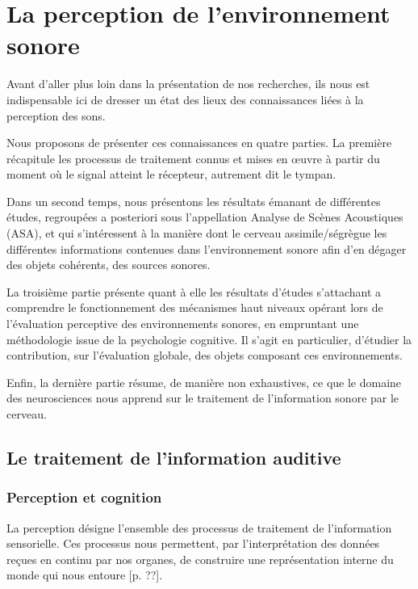 \chapter{La perception de l'environnement sonore}\label{ch:psycho_ea}

Avant d'aller plus loin dans la présentation de nos recherches, ils nous est indispensable ici de dresser  un état des lieux des connaissances liées à la perception des sons.

Nous proposons de présenter ces connaissances en quatre parties. La première récapitule les processus de traitement connus et mises en œuvre à partir du moment où le signal atteint le récepteur, autrement dit le tympan. 

Dans un second temps, nous présentons les résultats émanant de différentes études, regroupées a posteriori sous l'appellation Analyse de Scènes Acoustiques (ASA), et qui s'intéressent à la manière dont le cerveau assimile/ségrègue  les différentes informations contenues dans l'environnement sonore afin d'en dégager des objets cohérents, \ie des sources sonores. 

La troisième partie présente quant à elle les résultats d'études s'attachant a comprendre le fonctionnement  des mécanismes haut niveaux opérant lors de l'évaluation perceptive des environnements sonores, en empruntant une méthodologie issue de la psychologie cognitive. Il s'agit en particulier, d'étudier la contribution, sur l'évaluation globale, des objets composant ces environnements.

Enfin, la dernière partie résume, de manière non exhaustives, ce que le domaine des neurosciences nous apprend sur le traitement de l'information sonore par le cerveau. 

\section{Le traitement de l'information auditive}

\subsection{Perception et cognition}

La perception désigne l'ensemble des processus de traitement de l'information sensorielle. Ces processus nous permettent, par l'interprétation des données reçues en continu par nos organes, de construire une représentation interne du monde qui nous entoure [p. ??]\citep{Houix03f}.

